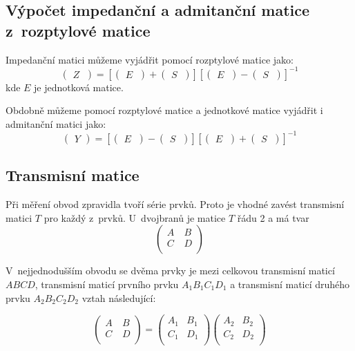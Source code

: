 \documentclass{protokol}
\begin{document}
\subsection{Výpočet impedanční a admitanční matice z~rozptylové matice}

Impedanční matici můžeme vyjádřit pomocí rozptylové matice jako:
\[
\begin{pmatrix}
	Z~\end{pmatrix}
=
[\begin{pmatrix}
	E~\end{pmatrix}
+
\begin{pmatrix}
	S~\end{pmatrix}]
%
[\begin{pmatrix}
	E~\end{pmatrix}
-
\begin{pmatrix}
	S~\end{pmatrix}]^{-1}
\]
kde $E$ je jednotková matice.
\bigskip

Obdobně můžeme pomocí rozptylové matice a jednotkové matice
vyjádřit i admitanční matici jako:
\[
\begin{pmatrix}
	Y
\end{pmatrix}
=
[\begin{pmatrix}
	E~\end{pmatrix}
-
\begin{pmatrix}
	S~\end{pmatrix}]
%
[\begin{pmatrix}
	E~\end{pmatrix}
+
\begin{pmatrix}
	S~\end{pmatrix}]^{-1}
\]

\subsection{Transmisní matice}
Při měření obvod zpravidla tvoří série prvků.
Proto je vhodné zavést transmisní matici $T$ pro každý z~prvků.
U~dvojbranů je matice $T$ řádu 2 a má tvar
\[
\begin{pmatrix}
	A~& B  \\
	C &	D  \\
\end{pmatrix}
\]

V~nejjednodušším obvodu se dvěma prvky je mezi celkovou transmisní
maticí $ABCD$, transmisní maticí prvního prvku $A_1B_1C_1D_1$
a transmisní maticí druhého prvku $A_2B_2C_2D_2$ vztah následující:

\[
\begin{pmatrix}
	A~& B  \\
	C &	D  \\
\end{pmatrix}
=
\begin{pmatrix}
	A_1 & B_1  \\
	C_1 & D_1  \\
\end{pmatrix}
%
\begin{pmatrix}
	A_2 & B_2  \\
	C_2 & D_2  \\
\end{pmatrix}
\]
\end{document}
